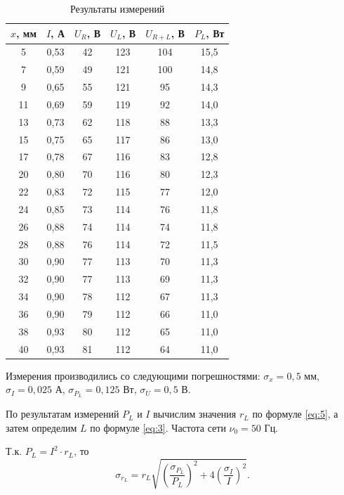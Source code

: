 \documentclass[a4paper,12pt]{article} %
\begin{document}
\begin{table}[H]
	\centering
	\begin{tabular}{|c|c|c|c|c|c|}
		\hline
		$ x $, мм  & $ I $, А    & $ U_R $, В & $ U_L $, В  & $ U_{R+L} $, В & $ P_L $, Вт   \\ \hline
		5  & 0,53 & 42 & 123 & 104 & 15,5 \\ \hline
		7  & 0,59 & 49 & 121 & 100 & 14,8 \\ \hline
		9  & 0,65 & 55 & 121 & 95  & 14,3 \\ \hline
		11 & 0,69 & 59 & 119 & 92  & 14,0 \\ \hline
		13 & 0,73 & 62 & 118 & 88  & 13,3 \\ \hline
		15 & 0,75 & 65 & 117 & 86  & 13,0 \\ \hline
		17 & 0,78 & 67 & 116 & 83  & 12,8 \\ \hline
		20 & 0,80 & 70 & 116 & 80  & 12,3 \\ \hline
		22 & 0,83 & 72 & 115 & 77  & 12,0 \\ \hline
		24 & 0,85 & 73 & 114 & 76  & 11,8 \\ \hline
		26 & 0,88 & 74 & 114 & 74  & 11,8 \\ \hline
		28 & 0,88 & 76 & 114 & 72  & 11,5 \\ \hline
		30 & 0,90 & 77 & 113 & 70  & 11,3 \\ \hline
		32 & 0,90 & 77 & 113 & 69  & 11,3 \\ \hline
		34 & 0,90 & 78 & 112 & 67  & 11,3 \\ \hline
		36 & 0,90 & 79 & 112 & 66  & 11,0 \\ \hline
		38 & 0,93 & 80 & 112 & 65  & 11,0 \\ \hline
		40 & 0,93 & 81 & 112 & 64  & 11,0 \\ \hline
	\end{tabular}
	\caption{Результаты измерений}
	\label{tab:1}
\end{table}

Измерения производились со следующими погрешностями: $ \sigma_x = 0,5 $ мм, $ \sigma_I = 0,025 $ А, $ \sigma_{P_L} = 0,125 $ Вт, $ \sigma_U = 0,5 $ В.

По результатам измерений $ P_L $ и $ I $ вычислим значения $ r_L $ по формуле \eqref{eq:5}, а затем определим $ L $ по формуле \eqref{eq:3}. Частота сети $ \nu_0 = 50 $ Гц.

Т.к. $ {P_L} = {I^2} \cdot {r_L} $, то
\begin{equation}\label{eq:11}
{\sigma _{{r_L}}} = {r_L}\sqrt {{{\left( {\frac{{{\sigma _{{P_L}}}}}{{{P_L}}}} \right)}^2} + 4{{\left( {\frac{{{\sigma _I}}}{I}} \right)}^2}}.
\end{equation}
\end{document}
